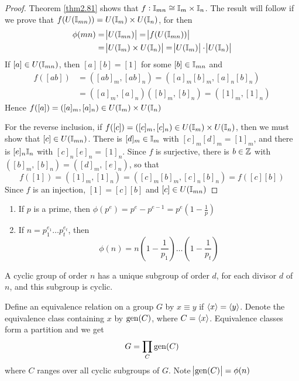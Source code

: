 \documentclass[11pt]{article}
\begin{document}
\begin{proof}
Theorem \ref{thm2.81} shows that \(f:\mathbb{I}_{mn}\cong\mathbb{I}_m\times\mathbb{I}_n\). The result will
follow if we prove that \(f(U(\mathbb{I}_{mn}))=U(\mathbb{I}_m)\times U(\mathbb{I}_n)\), for then
\begin{align*}
\phi(mn)&=\abs{U(\mathbb{I}_{mn})}=\abs{f(U(\mathbb{I}_{mn}))}\\
&=\abs{U(\mathbb{I}_m)\times U(\mathbb{I}_n)}=\abs{U(\mathbb{I}_m)}\cdot\abs{U(\mathbb{I}_n)}
\end{align*}
If \([a]\in U(\mathbb{I}_{mn})\), then \([a][b]=[1]\) for some \([b]\in\mathbb{I}_{mn}\) and
\begin{align*}
f([ab])&=([ab]_m,[ab]_n)=([a]_m[b]_m,[a]_n[b]_n)\\
&=([a]_m,[a]_n)([b]_m,[b]_n)=([1]_m,[1]_n)
\end{align*}
Hence \(f([a])=([a]_m,[a]_n)\in U(\mathbb{I}_m)\times U(\mathbb{I}_n)\)

For the reverse inclusion, if \(f([c])=([c]_m,[c]_n)\in U(\mathbb{I}_m)\times
   U(\mathbb{I}_n)\), then we must show that \([c]\in U(\mathbb{I}_{mn})\). There is \([d]_m\in\mathbb{I}_m\)
with \([c]_m[d]_m=[1]_m\), and there is \([e]_n\mathbb{I}_n\) with \([c]_n[e]_n=[1]_n\).
Since \(f\) is surjective, there is \(b\in\mathbb{Z}\) with
\(([b]_m,[b]_n)=([d]_m,[e]_n)\), so that
\begin{equation*}
f([1])=([1]_m,[1]_n)=([c]_m[b]_m,[c]_n[b]_n)=f([c][b])
\end{equation*}
Since \(f\) is an injection, \([1]=[c][b]\) and \([c]\in U(\mathbb{I}_{mn})\)
\end{proof}

\begin{corollary}[]
\begin{enumerate}
\item If \(p\) is a prime, then \(\phi(p^e)=p^e-p^{e-1}=p^e(1-\frac{1}{p})\)
\item If \(n=p_1^{e_1}\dots p_t^{e_t}\), then
\begin{equation*}
\phi(n)=n(1-\frac{1}{p_1})\dots(1-\frac{1}{p_t})
\end{equation*}
\end{enumerate}
\end{corollary}

\begin{lemma}[]
A cyclic group of order \(n\) has a unique subgroup of order \(d\), for each
divisor \(d\) of \(n\), and this subgroup is cyclic.
\end{lemma}

Define an equivalence relation on a group \(G\) by \(x\equiv y\) if \(\langle x\rangle=\langle
   y\rangle\). Denote the equivalence class containing \(x\) by \(\operatorname{gen}(C)\), where \(C=\langle
   x\rangle\). Equivalence classes form a partition and we get
\begin{equation*}
G=\displaystyle\prod_{C}\operatorname{gen}(C)
\end{equation*}
where \(C\) ranges over all cyclic subgroups of \(G\). Note \(\abs{\operatorname{gen}(C)}=\phi(n)\)
\end{document}
